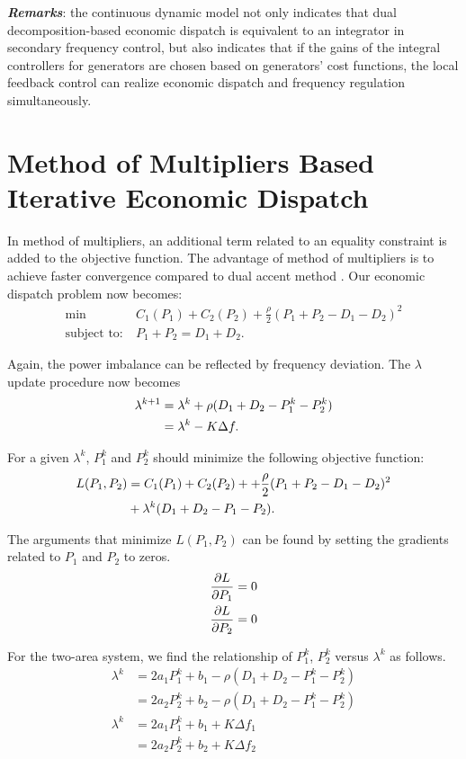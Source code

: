 \documentclass[10pt, journal, final, twocolumns]{IEEEtran}
\begin{document}
\emph{\textbf{Remarks}}: the continuous dynamic model not only indicates that dual decomposition-based economic dispatch is equivalent to an integrator in secondary frequency control, but also indicates that if the gains of the integral controllers for generators are chosen based on generators' cost functions, the local feedback control can realize economic dispatch and frequency regulation simultaneously.

\section{Method of Multipliers Based Iterative Economic Dispatch}
In method of multipliers, an additional term related to an equality constraint is added to the objective function. The advantage of method of multipliers is to achieve faster convergence compared to dual accent method \cite{boyd2011distributed}. Our economic dispatch problem now becomes:
\begin{align}
\min \>\>\>& C_1(P_1)+C_2(P_2) +\frac{\rho}{2}(P_1+P_2-D_1-D_2)^2\\
\text{subject to:}\>& P_1+P_2=D_1+D_2.
\end{align}

Again, the power imbalance can be reflected by frequency deviation. The $\lambda$ update procedure now becomes
\begin{align}
\lambda^{k+1} &= \lambda^k +\rho (D_1+D_2-P^k_1-P^k_2)\notag\\
& = \lambda^k -K\Delta f.
\label{eq:lambda}
\end{align}

For a given $\lambda^k$, $P^k_1$ and $P^k_2$ should minimize the following objective function:
\begin{align}
L(P_1, P_2)  &= C_1(P_1)+C_2(P_2) +  +\frac{\rho}{2}(P_1+P_2-D_1-D_2)^2 \notag \\
&+ \lambda^k(D_1+D_2-P_1-P_2).
\end{align}

The arguments that minimize $L(P_1, P_2)$ can be found by setting the gradients related to $P_1$ and $P_2$ to zeros.
\begin{align}
\frac{\partial L}{\partial P_1}& =0 \notag\\
\frac{\partial L}{\partial P_2}& =0
\end{align}


For the two-area system, we find the relationship of $P^k_1$, $P^k_2$ versus $\lambda^k$ as follows.
\begin{align}
\lambda^k &= 2a_1P^k_1 + b_1 - \rho(D_1+D_2-P^k_1-P^k_2)\\
&= 2a_2P^k_2 + b_2 - \rho(D_1+D_2-P^k_1-P^k_2)\\
\lambda^k & = 2a_1P^k_1 + b_1 +K\Delta f_1 \\
& = 2a_2P^k_2 + b_2 +K\Delta f_2
\label{eq:P1P2}
\end{align}
\end{document}
